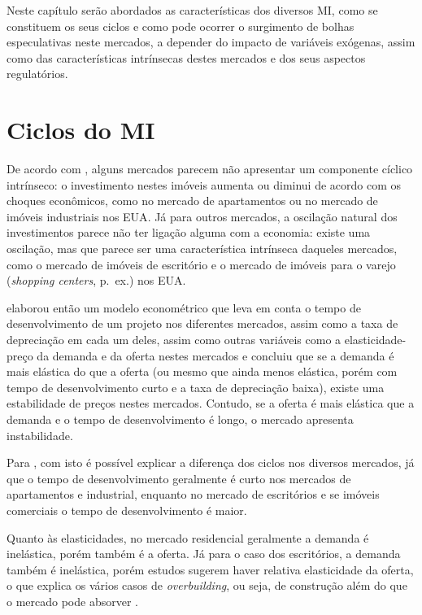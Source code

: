 \documentclass[
	12pt,				%
	oneside,			%
	a4paper,			%
	chapter=TITLE,		%
	section=TITLE,		%
	english,			%
	brazil				%
	]{abntex2}
\begin{document}
\begin{refsection}
Neste capítulo serão abordados as características dos diversos \gls{MI}, como
se constituem os seus ciclos e como pode ocorrer o surgimento de bolhas
especulativas neste mercados, a depender do impacto de variáveis exógenas, assim
como das características intrínsecas destes mercados e dos seus aspectos
regulatórios.

\hypertarget{ciclos-do}{%
\section{\texorpdfstring{Ciclos do \gls{MI}}{Ciclos do }}\label{ciclos-do}}

De acordo com \textcite[p.~212]{wheaton1999}, alguns mercados parecem não apresentar um
componente cíclico intrínseco: o investimento nestes imóveis aumenta ou diminui
de acordo com os choques econômicos, como no mercado de apartamentos ou no
mercado de imóveis industriais nos \gls{EUA}. Já para outros mercados, a
oscilação natural dos investimentos parece não ter ligação alguma com a
economia: existe uma oscilação, mas que parece ser uma característica intrínseca
daqueles mercados, como o mercado de imóveis de escritório e o mercado de
imóveis para o varejo (\emph{shopping centers}, p.~ex.) nos \gls{EUA}.

\textcite{wheaton1999} elaborou então um modelo econométrico que leva em conta o tempo de
desenvolvimento de um projeto nos diferentes mercados, assim como a taxa de
depreciação em cada um deles, assim como outras variáveis como a
elasticidade-preço da demanda e da oferta nestes mercados e concluiu que se a
demanda é mais elástica do que a oferta (ou mesmo que ainda menos elástica,
porém com tempo de desenvolvimento curto e a taxa de depreciação baixa),
existe uma estabilidade de preços nestes mercados. Contudo, se a oferta é mais
elástica que a demanda e o tempo de desenvolvimento é longo, o mercado
apresenta instabilidade.

Para \textcite[p.~228]{wheaton1999}, com isto é possível explicar a diferença dos ciclos
nos diversos mercados, já que o tempo de desenvolvimento geralmente é curto nos
mercados de apartamentos e industrial, enquanto no mercado de escritórios e se
imóveis comerciais o tempo de desenvolvimento é maior.

Quanto às elasticidades, no mercado residencial geralmente a demanda é
inelástica, porém também é a oferta. Já para o caso dos escritórios, a demanda
também é inelástica, porém estudos sugerem haver relativa elasticidade da oferta,
o que explica os vários casos de \emph{overbuilding}, ou seja, de construção além do
que o mercado pode absorver \autocite[p.~228]{wheaton1999}.


\end{refsection}
\end{document}
